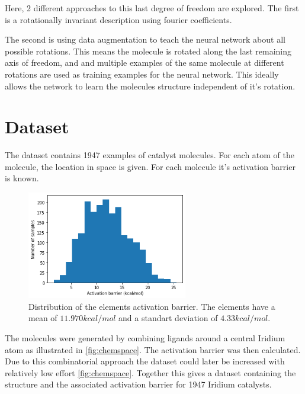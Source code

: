 Here, 2 different approaches to this last degree of freedom are explored.
The first is a rotationally invariant description using fourier coefficients.

The second is using data augmentation to teach the neural network about all possible rotations.
This means the molecule is rotated along the last remaining axis of freedom, and and multiple examples of the same molecule at different rotations are used as training examples for the neural network.
This ideally allows the network to learn the molecules structure independent of it's rotation.


\section{Dataset}

The dataset contains 1947 examples of catalyst molecules.
For each atom of the molecule, the location in space is given.
For each molecule it's activation barrier is known.

\begin{figure}
  \centering
  \includegraphics[width=7cm]{figures/introduction/barrier.png}
  \caption{Distribution of the elements activation barrier. The elements have a mean of $11.970 kcal/mol$ and a standart deviation of $4.33 kcal/mol$.}
  \label{fig:barriers}
\end{figure}

The molecules were generated by combining ligands around a central Iridium atom as illustrated in \autoref{fig:chemspace}.
The activation barrier was then calculated.
Due to this combinatorial approach the dataset could later be increased with relatively low effort \ref{fig:chemspace}.
Together this gives a dataset containing the structure and the associated activation barrier for 1947 Iridium catalysts.

